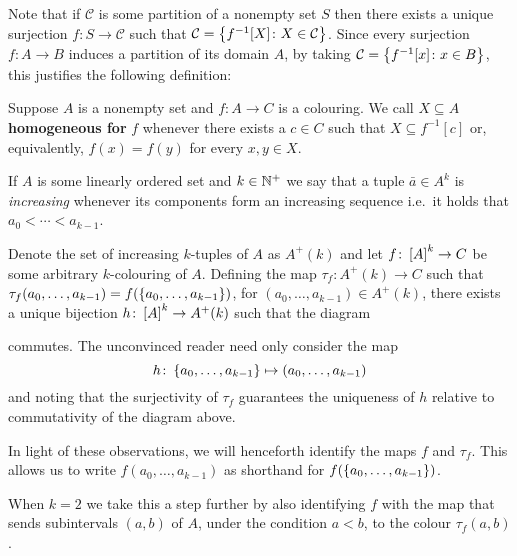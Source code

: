 Note that if $\mathcal{C}$ is some partition of a nonempty set $S$ then there
exists a unique surjection $f\colon S\to \mathcal{C}$ such that
$\mathcal{C}=\setbuild{f^{-1}[X]}{X\in \mathcal{C}}$. Since every surjection
$f\colon A\to B$ induces a partition of its domain $A$, by taking
$\mathcal{C}=\setbuild{f^{-1}[x]}{x\in B}$, this justifies the following
definition:

\begin{dfn}
	Suppose $A$ is a nonempty set and $f\colon A\to C$ is a colouring.  We call
	$X\subseteq A$ \textbf{homogeneous for} $f$ whenever there exists a $c\in
	C$ such that $X\subseteq f^{-1}[c]$ or, equivalently, $f(x)=f(y)$ for every
	$x,y\in X$.
\end{dfn}

If $A$ is some linearly ordered set and $k\in\posnats$ we say that a tuple
$\bar{a}\in A^k$ is \textit{increasing} whenever its components form an
increasing sequence i.e.\ it holds that $a_0<\dotsb<a_{k-1}$.

Denote the set of increasing $k$-tuples of $A$ as $A^+(k)$ and let $f\colon
\subsets{k}{A}\to C$ be some arbitrary $k$-colouring of $A$.  Defining the map
$\tau_f\colon A^+(k)\to C$ such that
$\tau_f(a_0,\dotsc,a_{k-1})=f(\set{a_0,\dotsc,a_{k-1}})$, for
$(a_0,\dotsc,a_{k-1})\in A^+(k)$, there exists a unique bijection $h\colon
\subsets{k}{A}\to A^+(k)$ such that the diagram
\begin{center}
\end{center}
commutes.  The unconvinced reader need only consider the map
\begin{equation}
	h\colon\set{a_0,\dotsc,a_{k-1}}\mapsto(a_0,\dotsc,a_{k-1})
\end{equation}
and noting that the surjectivity of $\tau_f$ guarantees the uniqueness of $h$
relative to commutativity of the diagram above.

\begin{conv}[Colourings]\label{rem:Col}
	In light of these observations, we will henceforth identify the maps $f$ and
	$\tau_f$.  This allows us to write $f(a_0,\dotsc,a_{k-1})$ as
	shorthand for $f(\set{a_0,\dotsc,a_{k-1}})$.

	When $k=2$ we take this a step further by also identifying $f$ with the map
	that sends subintervals $(a,b)$ of $A$, under the condition $a<b$, to the
	colour $\tau_f(a,b)$.
\end{conv}


